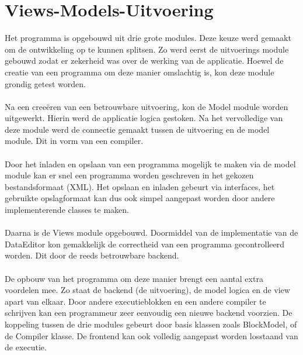 \documentclass[]{article}
\begin{document}
\section{Views-Models-Uitvoering}
Het programma is opgebouwd uit drie grote modules. Deze keuze werd gemaakt om de ontwikkeling op te kunnen splitsen. Zo werd eerst de  uitvoerings module gebouwd zodat er zekerheid was over de werking van de applicatie. Hoewel de creatie van een programma om deze manier omslachtig is, kon deze module grondig getest worden.\\\\
Na een cree\"{e}ren van een betrouwbare uitvoering, kon de Model module worden uitgewerkt. Hierin werd de applicatie logica gestoken. Na het vervolledige van deze module werd de connectie gemaakt tussen de uitvoering en de model module. Dit in vorm van een compiler.\\\\
Door het inladen en opslaan van een programma mogelijk te maken via de model module kan er snel een programma worden geschreven in het gekozen bestandsformaat (XML). Het opslaan en inladen gebeurt via interfaces, het gebruikte opslagformaat kan dus ook simpel aangepast worden door andere implementerende classes te maken. \\\\
Daarna is de Views module opgebouwd. Doormiddel van de implementatie van de DataEditor kon gemakkelijk de correctheid van een programma gecontrolleerd worden. Dit door de reeds betrouwbare backend.\\\\
De opbouw van het programma om deze manier brengt een aantal extra voordelen mee. Zo staat de backend (de uitvoering), de model logica en de view apart van elkaar. Door andere executieblokken en een andere compiler te schrijven kan een programmeur zeer eenvoudig een nieuwe backend voorzien. De koppeling tussen de drie modules gebeurt door basis klassen zoals BlockModel, of de Compiler klasse. De frontend kan ook volledig aangepast worden losstaand van de executie. 
\end{document}
